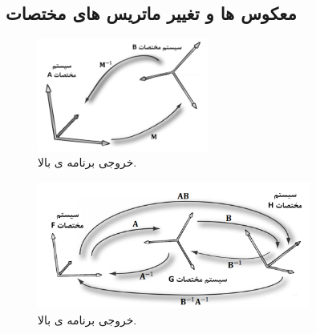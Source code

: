 \subsection{\textbf{معکوس ها و تغییر ماتریس های مختصات}}
{
    \Large
    \begin{spacing}{1.5}
        \begin{flushleft}
        \end{flushleft}

        \begin{figure}[H]
            \centering
            \setlength{\belowcaptionskip}{-10pt}
            \includegraphics[width=0.5\textwidth]{Images/4/3/4.Session.1.3.13}
            \caption {خروجی برنامه ی بالا.}
            \label{fig:4.Session.1.3.13}
        \end{figure}

        \begin{figure}[H]
            \centering
            \setlength{\belowcaptionskip}{-10pt}
            \includegraphics[width=0.8\textwidth]{Images/4/3/4.Session.1.3.14}
            \caption {خروجی برنامه ی بالا.}
            \label{fig:4.Session.1.3.14}
        \end{figure}

    \end{spacing}
}

